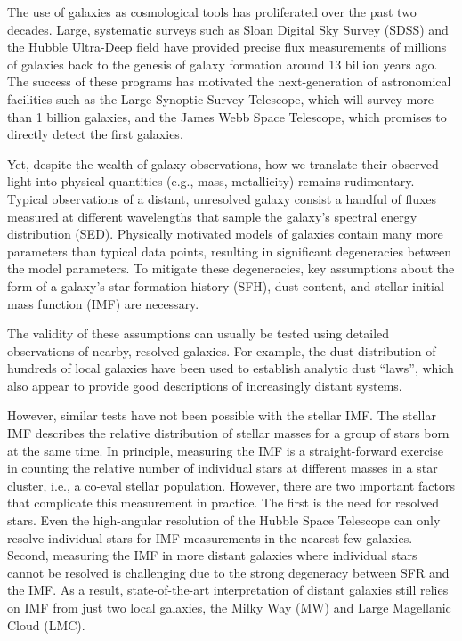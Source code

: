 \documentclass[11pt,preprint]{aastex}
\begin{document}
The use of galaxies as cosmological tools has proliferated over the past two decades.  Large, systematic surveys such as Sloan Digital Sky Survey (SDSS) and the Hubble Ultra-Deep field have provided precise flux measurements of millions of galaxies back to the genesis of galaxy formation around 13 billion years ago.  The success of these programs has motivated the next-generation of astronomical facilities such as the Large Synoptic Survey Telescope, which will survey more than 1 billion galaxies, and the James Webb Space Telescope, which promises to directly detect the first galaxies.

Yet, despite the wealth of galaxy observations, how we translate their observed light into physical quantities (e.g., mass, metallicity) remains rudimentary.  Typical observations of a distant, unresolved galaxy consist a handful of fluxes measured at different wavelengths that sample the galaxy's spectral energy distribution (SED).  Physically motivated models of galaxies contain many more parameters than typical data points, resulting in significant degeneracies between the model parameters. To mitigate these degeneracies, key assumptions about the form of a galaxy's star formation history (SFH), dust content, and stellar initial mass function (IMF) are necessary.  

The validity of these assumptions can usually be tested using detailed observations of nearby, resolved galaxies.  For example, the dust distribution of hundreds of local galaxies have been used to establish analytic dust ``laws'', which also appear to provide good descriptions of increasingly distant systems.

However, similar tests have not been possible with the stellar IMF.  The stellar IMF describes the relative distribution of stellar masses for a group of stars born at the same time.  In principle, measuring the IMF is a straight-forward exercise in counting the relative number of individual stars at different masses in a star cluster, i.e., a co-eval stellar population.  However, there are two important factors that complicate this measurement in practice.  The first is the need for resolved stars.  Even the high-angular resolution of the Hubble Space Telescope can only resolve individual stars for IMF measurements in the nearest few galaxies.  Second, measuring the IMF in more distant galaxies where individual stars cannot be resolved is challenging due to the strong degeneracy between SFR and the IMF.  As a result, state-of-the-art interpretation of distant galaxies still  relies on IMF from just two local galaxies, the Milky Way (MW) and Large Magellanic Cloud (LMC).  
\end{document}
